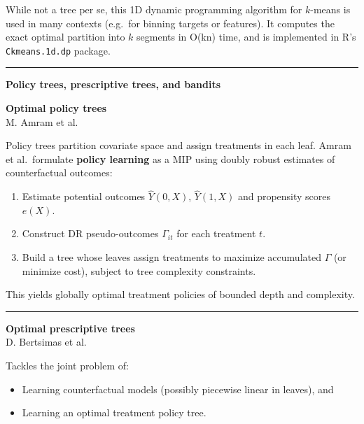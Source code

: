 \documentclass[a5paper]{article}
\providecommand{\tightlist}{%
  \setlength{\itemsep}{0pt}\setlength{\parskip}{0pt}}
\def\subsection#1{{\par\bigskip\goodbreak\large\bfseries #1\par}}
\begin{document}
While not a tree per se, this 1D dynamic programming algorithm for
$k$-means is used in many contexts (e.g.~for binning targets or features).
It computes the exact optimal partition into $k$ segments in O(kn) time,
and is implemented in R's \texttt{Ckmeans.1d.dp} package.

\begin{center}\rule{0.5\linewidth}{0.5pt}\end{center}

\subsection{Policy trees, prescriptive trees, and
bandits}\label{policy-trees-prescriptive-trees-and-bandits}

\textbf{Optimal policy trees}\\
M. Amram et al.

Policy trees partition covariate space and assign treatments in each
leaf. Amram et al.~formulate \textbf{policy learning} as a MIP using
doubly robust estimates of counterfactual outcomes:

\begin{enumerate}
\def\labelenumi{\arabic{enumi}.}
\tightlist
\item
  Estimate potential outcomes $\hat Y(0,X)$, $\hat Y(1,X)$ and
  propensity scores $e(X)$.
\item
  Construct DR pseudo-outcomes $\Gamma_{it}$ for each treatment $t$.
\item
  Build a tree whose leaves assign treatments to maximize accumulated $\Gamma$
  (or minimize cost), subject to tree complexity constraints.
\end{enumerate}

This yields globally optimal treatment policies of bounded depth and
complexity.

\begin{center}\rule{0.5\linewidth}{0.5pt}\end{center}

\textbf{Optimal prescriptive trees}\\
D. Bertsimas et al.

Tackles the joint problem of:

\begin{itemize}
\tightlist
\item
  Learning counterfactual models (possibly piecewise linear in leaves),
  and
\item
  Learning an optimal treatment policy tree.
\end{itemize}
\end{document}
